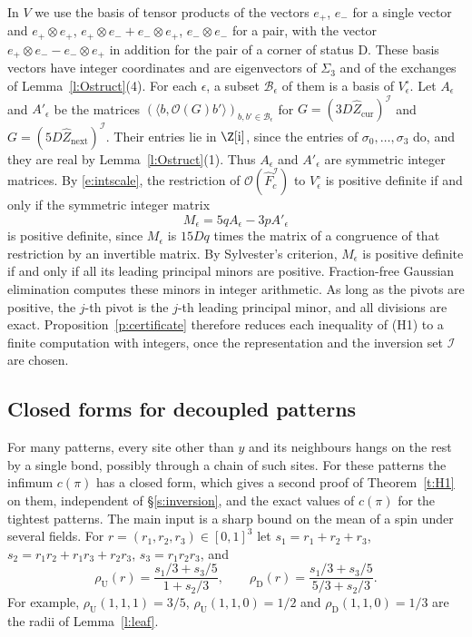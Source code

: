 In $V$ we use the basis of tensor products of the vectors $e_+$, $e_-$ for a single vector and $e_+ \otimes e_+$, $e_+ \otimes e_- + e_- \otimes e_+$, $e_- \otimes e_-$ for a pair, with the vector $e_+ \otimes e_- - e_- \otimes e_+$ in addition for the pair of a corner of status $\mathrm D$. These basis vectors have integer coordinates and are eigenvectors of $\Sigma_3$ and of the exchanges of Lemma~\ref{l:Ostruct}(4). For each $\epsilon$, a subset $\mathcal B_\epsilon$ of them is a basis of $V_\epsilon^{\circ}$. Let $A_\epsilon$ and $A'_\epsilon$ be the matrices $(\langle b, \mathcal O(G) b' \rangle)_{b, b' \in \mathcal B_\epsilon}$ for $G = (3 D \hat Z_{\mathrm{cur}})^{\mathcal I}$ and $G = (5 D \hat Z_{\mathrm{next}})^{\mathcal I}$. Their entries lie in $\Z[\mathrm i]$, since the entries of $\sigma_0, \dots, \sigma_3$ do, and they are real by Lemma~\ref{l:Ostruct}(1). Thus $A_\epsilon$ and $A'_\epsilon$ are symmetric integer matrices. By \eqref{e:intscale}, the restriction of $\mathcal O(\hat F_c^{\mathcal I})$ to $V_\epsilon^{\circ}$ is positive definite if and only if the symmetric integer matrix
\begin{equation}\label{e:Meps}
M_\epsilon = 5 q A_\epsilon - 3 p A'_\epsilon
\end{equation}
is positive definite, since $M_\epsilon$ is $15 D q$ times the matrix of a congruence of that restriction by an invertible matrix. By Sylvester's criterion, $M_\epsilon$ is positive definite if and only if all its leading principal minors are positive. Fraction-free Gaussian elimination \cite{Bar68} computes these minors in integer arithmetic. As long as the pivots are positive, the $j$-th pivot is the $j$-th leading principal minor, and all divisions are exact. Proposition~\ref{p:certificate} therefore reduces each inequality of (H1) to a finite computation with integers, once the representation and the inversion set $\mathcal I$ are chosen.

\subsection{Closed forms for decoupled patterns}\label{s:closed}

For many patterns, every site other than $y$ and its neighbours hangs on the rest by a single bond, possibly through a chain of such sites. For these patterns the infimum $c(\pi)$ has a closed form, which gives a second proof of Theorem~\ref{t:H1} on them, independent of \S\ref{s:inversion}, and the exact values of $c(\pi)$ for the tightest patterns. The main input is a sharp bound on the mean of a spin under several fields. For $r = (r_1, r_2, r_3) \in [0, 1]^3$ let $s_1 = r_1 + r_2 + r_3$, $s_2 = r_1 r_2 + r_1 r_3 + r_2 r_3$, $s_3 = r_1 r_2 r_3$, and
\begin{equation}\label{e:rhoUD}
\rho_{\mathrm U}(r) = \frac{s_1/3 + s_3/5}{1 + s_2/3}, \qquad \rho_{\mathrm D}(r) = \frac{s_1/3 + s_3/5}{5/3 + s_2/3} .
\end{equation}
For example, $\rho_{\mathrm U}(1, 1, 1) = 3/5$, $\rho_{\mathrm U}(1, 1, 0) = 1/2$ and $\rho_{\mathrm D}(1, 1, 0) = 1/3$ are the radii of Lemma~\ref{l:leaf}.

